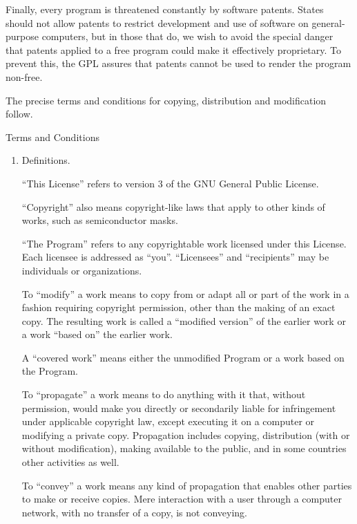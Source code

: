 \documentclass[10pt]{book}
\begin{document}
Finally, every program is threatened constantly by software patents.
States should not allow patents to restrict development and use of
software on general-purpose computers, but in those that do, we wish to
avoid the special danger that patents applied to a free program could
make it effectively proprietary.  To prevent this, the GPL assures that
patents cannot be used to render the program non-free.

The precise terms and conditions for copying, distribution and
modification follow.

\begin{center}
{\Large \sc Terms and Conditions}
\end{center}


\begin{enumerate}

\addtocounter{enumi}{-1}

\item Definitions.

``This License'' refers to version 3 of the GNU General Public License.

``Copyright'' also means copyright-like laws that apply to other kinds of
works, such as semiconductor masks.

``The Program'' refers to any copyrightable work licensed under this
License.  Each licensee is addressed as ``you''.  ``Licensees'' and
``recipients'' may be individuals or organizations.

To ``modify'' a work means to copy from or adapt all or part of the work
in a fashion requiring copyright permission, other than the making of an
exact copy.  The resulting work is called a ``modified version'' of the
earlier work or a work ``based on'' the earlier work.

A ``covered work'' means either the unmodified Program or a work based
on the Program.

To ``propagate'' a work means to do anything with it that, without
permission, would make you directly or secondarily liable for
infringement under applicable copyright law, except executing it on a
computer or modifying a private copy.  Propagation includes copying,
distribution (with or without modification), making available to the
public, and in some countries other activities as well.

To ``convey'' a work means any kind of propagation that enables other
parties to make or receive copies.  Mere interaction with a user through
a computer network, with no transfer of a copy, is not conveying.


\end{enumerate}
\end{document}
